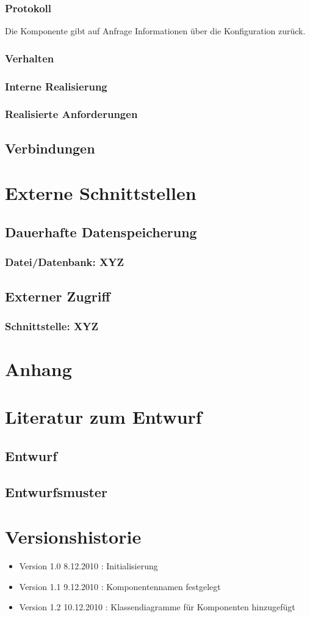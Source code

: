 \documentclass[a4paper,12pt]{scrartcl}
\begin{document}
\subsubsection{Protokoll}
Die Komponente gibt auf Anfrage Informationen über die Konfiguration zurück.
\subsubsection{Verhalten}
\subsubsection{Interne Realisierung}
\subsubsection{Realisierte Anforderungen}

\subsection{Verbindungen}

\section{Externe Schnittstellen}
\subsection{Dauerhafte Datenspeicherung}
\subsubsection{Datei/Datenbank: XYZ}
\subsection{Externer Zugriff}
\subsubsection{Schnittstelle: XYZ}

\appendix%

\section{Anhang}

\section{Literatur zum Entwurf}
\subsection{Entwurf}
\subsection{Entwurfsmuster}
\section{Versionshistorie}
\begin{itemize}
\item Version 1.0 8.12.2010 : Initialisierung
\item Version 1.1 9.12.2010 : Komponentennamen festgelegt
\item Version 1.2 10.12.2010 : Klassendiagramme für Komponenten hinzugefügt
\end{itemize}
\end{document}
